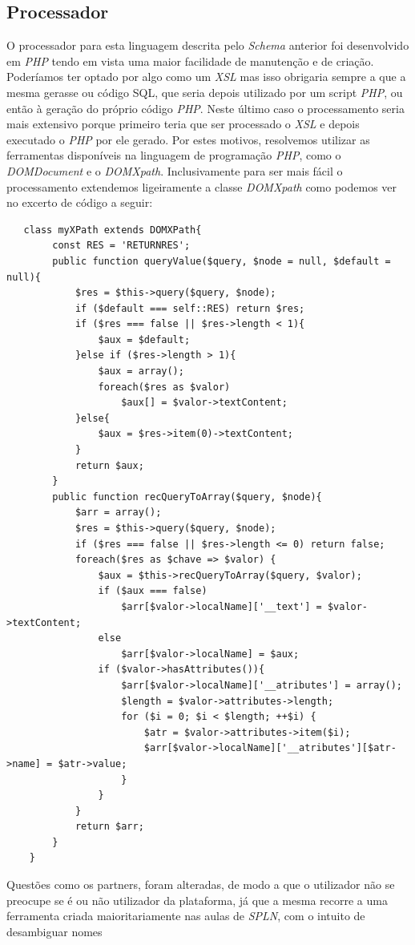\documentclass[a4paper,11pt,openright,openbib]{article}
\begin{document}
\subsection{Processador}
O processador para esta linguagem descrita pelo \emph{Schema} anterior foi desenvolvido em \emph{PHP} tendo em vista uma maior facilidade de manutenção e de criação. Poderíamos ter optado por algo como um \emph{XSL} mas isso obrigaria sempre a que a mesma gerasse ou código SQL, que seria depois utilizado por um script \emph{PHP}, ou então à geração do próprio código \emph{PHP}. Neste último caso o processamento seria mais extensivo porque primeiro teria que ser processado o \emph{XSL} e depois executado o \emph{PHP} por ele gerado. Por estes motivos, resolvemos utilizar as ferramentas disponíveis na linguagem de programação \emph{PHP}, como o \emph{DOMDocument} e o \emph{DOMXpath}. Inclusivamente para ser mais fácil o processamento extendemos ligeiramente a classe \emph{DOMXpath} como podemos ver no excerto de código a seguir:
\begin{verbatim}
   class myXPath extends DOMXPath{
        const RES = 'RETURNRES';
        public function queryValue($query, $node = null, $default = null){
            $res = $this->query($query, $node);
            if ($default === self::RES) return $res;
            if ($res === false || $res->length < 1){
                $aux = $default;
            }else if ($res->length > 1){
                $aux = array();
                foreach($res as $valor)
                    $aux[] = $valor->textContent;
            }else{
                $aux = $res->item(0)->textContent;
            }
            return $aux;
        }
        public function recQueryToArray($query, $node){
            $arr = array();
            $res = $this->query($query, $node);
            if ($res === false || $res->length <= 0) return false;
            foreach($res as $chave => $valor) {
                $aux = $this->recQueryToArray($query, $valor);
                if ($aux === false)
                    $arr[$valor->localName]['__text'] = $valor->textContent;
                else 
                    $arr[$valor->localName] = $aux;
                if ($valor->hasAttributes()){
                    $arr[$valor->localName]['__atributes'] = array();
                    $length = $valor->attributes->length;
                    for ($i = 0; $i < $length; ++$i) {
                        $atr = $valor->attributes->item($i);
                        $arr[$valor->localName]['__atributes'][$atr->name] = $atr->value;  
                    }
                }
            }
            return $arr;
        }
    }
\end{verbatim}
Questões como os partners, foram alteradas, de modo a que o utilizador não se preocupe se é ou não utilizador da plataforma, já que a mesma recorre a uma ferramenta criada maioritariamente nas aulas de \emph{SPLN}, com o intuito de desambiguar nomes
\end{document}
